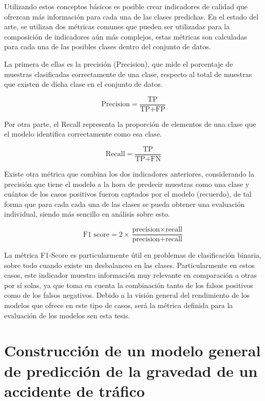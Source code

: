 \documentclass{uathesis-es}
\begin{document}
Utilizando estos conceptos básicos es posible crear indicadores de calidad que ofrezcan más información para cada una de las clases predichas. En el estado del arte, se utilizan dos métricas comunes que pueden ser utilizadas para la composición de indicadores aún más complejos, estas métricas son calculadas para cada una de las posibles clases dentro del conjunto de datos.

La primera de ellas es la precisión (Precision), que mide el porcentaje de muestras clasificadas correctamente de una clase, respecto al total de muestras que existen de dicha clase en el conjunto de datos.

$$\text{Precision} = \frac{{\text{TP}}}{{\text{TP} + \text{FP}}}$$

Por otra parte, el Recall representa la proporción de elementos de una clase que el modelo identifica correctamente como esa clase.

$$\text{Recall} = \frac{{\text{TP}}}{{\text{TP} + \text{FN}}}$$

Existe otra métrica que combina los dos indicadores anteriores, considerando la precisión que tiene el modelo a la hora de predecir muestras como una clase y cuántos de los casos positivos fueron captados por el modelo (recuerdo), de tal forma que para cada cada una de las clases se pueda obtener una evaluación individual, siendo más sencillo en análisis sobre esto. 

$$\text{F1 score} = 2 \times \frac{{\text{precision} \times \text{recall}}}{{\text{precision} + \text{recall}}}$$




La métrica F1-Score es particularmente útil en problemas de clasificación binaria, sobre todo cuando existe un desbalanceo en las clases. Particularmente en estos casos, este indicador muestra información muy relevante en comparación a otras por sí solas, ya que toma en cuenta la combinación tanto de los falsos positivos como de los falsos negativos. Debido a la visión general del rendimiento de los modelos que ofrece en este tipo de casos, será la métrica definida para la evaluación de los modelos sen esta tesis.




\chapter{Construcción de un modelo general de predicción de la gravedad de un accidente de tráfico}
\end{document}
